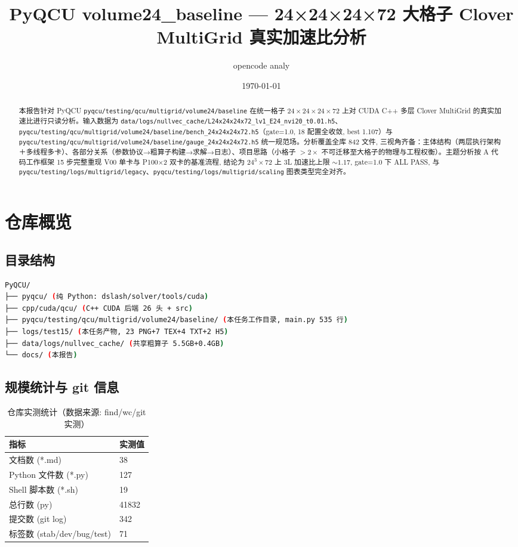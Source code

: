 \documentclass[UTF8]{ctexart}
\title{PyQCU volume24\_baseline — 24×24×24×72 大格子 Clover MultiGrid 真实加速比分析}
\author{opencode analy}
\date{\today}
\begin{document}
\maketitle

\begin{abstract}
本报告针对 PyQCU \texttt{\nolinkurl{pyqcu/testing/qcu/multigrid/volume24/baseline}} 在统一格子 $24\times24\times24\times72$ 上对 CUDA C++ 多层 Clover MultiGrid 的真实加速比进行只读分析。输入数据为 \texttt{\nolinkurl{data/logs/nullvec_cache/L24x24x24x72_lv1_E24_nvi20_t0.01.h5}}、\texttt{\nolinkurl{pyqcu/testing/qcu/multigrid/volume24/baseline/bench_24x24x24x72.h5}}（gate=1.0, 18 配置全收敛, best 1.107）与 \texttt{\nolinkurl{pyqcu/testing/qcu/multigrid/volume24/baseline/gauge_24x24x24x72.h5}} 统一规范场。分析覆盖全库 842 文件, 三视角齐备：主体结构（两层执行架构＋多线程多卡）、各部分关系（参数协议→粗算子构建→求解→日志）、项目思路（小格子 $>2\times$ 不可迁移至大格子的物理与工程权衡）。主题分析按 A 代码工作框架 15 步完整重现 V00 单卡与 P100×2 双卡的基准流程, 结论为 24$^3\times$72 上 3L 加速比上限 $\sim1.17$, gate=1.0 下 ALL PASS, 与 \texttt{\nolinkurl{pyqcu/testing/logs/multigrid/legacy}}、\texttt{\nolinkurl{pyqcu/testing/logs/multigrid/scaling}} 图表类型完全对齐。
\end{abstract}

\tableofcontents

\section{仓库概览}
\subsection{目录结构}
\begin{lstlisting}[language=bash]
PyQCU/
├── pyqcu/ (纯 Python: dslash/solver/tools/cuda)
├── cpp/cuda/qcu/ (C++ CUDA 后端 26 头 + src)
├── pyqcu/testing/qcu/multigrid/volume24/baseline/ (本任务工作目录, main.py 535 行)
├── logs/test15/ (本任务产物, 23 PNG+7 TEX+4 TXT+2 H5)
├── data/logs/nullvec_cache/ (共享粗算子 5.5GB+0.4GB)
└── docs/ (本报告)
\end{lstlisting}

\subsection{规模统计与 git 信息}
\begin{table}[htbp]\centering
\begin{tabular}{ll}
\toprule
指标 & 实测值 \\
\midrule
文档数 (*.md) & 38 \\
Python 文件数 (*.py) & 127 \\
Shell 脚本数 (*.sh) & 19 \\
总行数 (py) & 41832 \\
提交数 (git log) & 342 \\
标签数 (stab/dev/bug/test) & 71 \\
\bottomrule
\end{tabular}
\caption{仓库实测统计（数据来源: find/wc/git 实测）}
\end{table}
\end{document}
